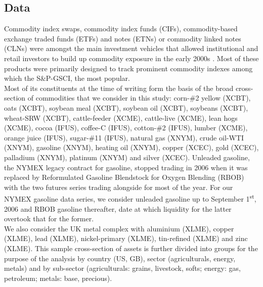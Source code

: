 \documentclass[
  authoryear,
  preprint,
  3p]{elsarticle}
\begin{document}
\subsection{Data}\label{sec-data}

Commodity index swaps, commodity index funds (CIFs), commodity-based
exchange traded funds (ETFs) and notes (ETNs) or commodity linked notes
(CLNs) were amongst the main investment vehicles that allowed
institutional and retail investors to build up commodity exposure in the
early 2000s
\citep{boons_stock_2012, henderson_new_2015, irwin_index_2011, unctad_global_2009, schumann_hunger_2011}.
Most of these products were primarily designed to track prominent
commodity indexes among which the S\&P-GSCI, the most popular.\\
Most of its constituents at the time of writing form the basis of the
broad cross-section of commodities that we consider in this study:
corn-\#2 yellow (XCBT), oats (XCBT), soybean meal (XCBT), soybean oil
(XCBT), soybeans (XCBT), wheat-SRW (XCBT), cattle-feeder (XCME),
cattle-live (XCME), lean hogs (XCME), cocoa (IFUS), coffee-C (IFUS),
cotton-\#2 (IFUS), lumber (XCME), orange juice (IFUS), sugar-\#11
(IFUS), natural gas (XNYM), crude oil-WTI (XNYM), gasoline (XNYM),
heating oil (XNYM), copper (XCEC), gold (XCEC), palladium (XNYM),
platinum (XNYM) and silver (XCEC). Unleaded gasoline, the NYMEX legacy
contract for gasoline, stopped trading in 2006 when it was replaced by
Reformulated Gasoline Blendstock for Oxygen Blending (RBOB) with the two
futures series trading alongside for most of the year. For our NYMEX
gasoline data series, we consider unleaded gasoline up to September
1\textsuperscript{st}, 2006 and RBOB gasoline thereafter, date at which
liquidity for the latter overtook that for the former.\\
We also consider the UK metal complex with aluminium (XLME), copper
(XLME), lead (XLME), nickel-primary (XLME), tin-refined (XLME) and zinc
(XLME). This sample cross-section of assets is further divided into
groups for the purpose of the analysis by country (US, GB), sector
(agriculturals, energy, metals) and by sub-sector (agriculturals:
grains, livestock, softs; energy: gas, petroleum; metals: base,
precious).

\medskip
\end{document}
